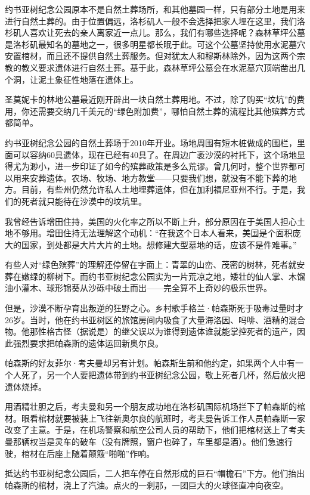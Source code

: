 \documentclass[12pt,oneside]{book}
\begin{document}
\begin{bookref}[frametitle={\cite{好好告别：世界葬礼观察手记}}]
约书亚树纪念公园原本不是自然土葬场所，和其他墓园一样，只有部分土地是用来进行自然土葬的。由于位置偏远，洛杉矶人一般不会选择把家人埋在这里，我们洛杉矶人喜欢让死去的亲人离家近一点儿。那么，我们有哪些选择呢？森林草坪公墓是洛杉矶最知名的墓地之一，很多明星都长眠于此。可这个公墓坚持使用水泥墓穴安置棺材，而且还不提供自然土葬服务。但对犹太人和穆斯林除外，因为这两个宗教的教义要求遗体进行自然土葬。基于此，森林草坪公墓会在水泥墓穴顶端凿出几个洞，让泥土象征性地落在遗体上。

圣莫妮卡的林地公墓最近刚开辟出一块自然土葬用地。不过，除了购买“坟坑”的费用，你还需要交纳几千美元的“绿色附加费”，哪怕自然土葬的流程比其他殡葬方式都简单。

约书亚树纪念公园的自然土葬场于2010年开业。场地周围有短木桩做成的围栏，里面可以容纳60具遗体，现在已经有40具了。在周边广袤沙漠的衬托下，这个场地显得尤为渺小，进一步印证了如今的殡葬政策是多么荒谬。曾几何时，整个世界都可以用来安葬遗体。农场、牧场、地方教堂——只要我们想，就没有不能下葬的地方。目前，有些州仍然允许私人土地埋葬遗体，但在加利福尼亚州不行。于是，我们的死者就只能待在沙漠中的坟坑里。

我曾经告诉增田住持，美国的火化率之所以不断上升，部分原因在于美国人担心土地不够用。增田住持无法理解这个动机：“在我这个日本人看来，美国是个面积庞大的国家，到处都是大片大片的土地。想修建大型墓地的话，应该不是件难事。”

有些人对“绿色殡葬”的理解还停留在字面上：青翠的山峦、茂密的树林，死者就安葬在嫩绿的柳树下。而约书亚树纪念公园实为一片荒凉之地，矮壮的仙人掌、木馏油小灌木、球形锦葵从沙砾中破土而出——完全算不上奇妙的极乐世界。

但是，沙漠不断孕育出叛逆的狂野之心。乡村歌手格兰·帕森斯死于吸毒过量时才26岁。当时，他在约书亚树区的旅馆房间内吸食了大量海洛因、吗啡、酒精的混合物。他那性格古怪（据说是）的继父误以为谁得到遗体谁就能掌控死者的遗产，因此强烈要求把帕森斯的遗体运回新奥尔良。

帕森斯的好友菲尔·考夫曼却另有计划。帕森斯生前和他约定，如果两个人中有一个人死了，另一个人要把遗体带到约书亚树纪念公园，敬上死者几杯，然后放火把遗体烧掉。

用酒精壮胆之后，考夫曼和另一个朋友成功地在洛杉矶国际机场拦下了帕森斯的棺材。眼看棺材就要被装上飞往新奥尔良的航班时，考夫曼告诉工作人员帕森斯一家改变了主意。于是，在机场警察和航空公司人员的帮助下，他们把棺材送上了考夫曼那辆权当是灵车的破车（没有牌照，窗户也碎了，车里都是酒）。他们急速行驶，棺材在后座上随着颠簸“啪啪”作响。

抵达约书亚树纪念公园后，二人把车停在自然形成的巨石“帽檐石”下方。他们抬出帕森斯的棺材，浇上了汽油。点火的一刹那，一团巨大的火球径直冲向夜空。


\end{bookref}
\end{document}

